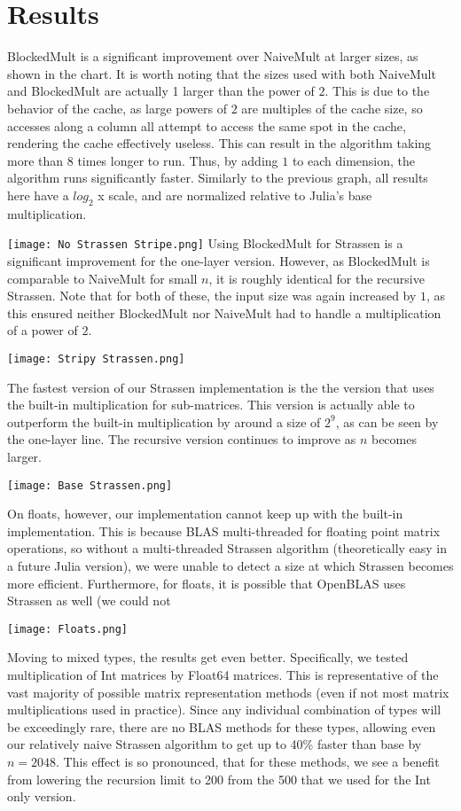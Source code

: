\documentclass{article}         %
\begin{document}
\section*{Results}
BlockedMult is a significant improvement over NaiveMult at larger sizes, as shown in the chart. It is worth noting that the sizes used with both NaiveMult and BlockedMult are actually 1 larger than the power of $2$. This is due to the behavior of the cache, as large powers of $2$ are multiples of the cache size, so accesses along a column all attempt to access the same spot in the cache, rendering the cache effectively useless. This can result in the algorithm taking more than $8$ times longer to run. Thus, by adding $1$ to each dimension, the algorithm runs significantly faster. Similarly to the previous graph, all results here have a $log_2$ x scale, and are normalized relative to Julia's base multiplication.

\texttt{[image: No Strassen Stripe.png]}
Using BlockedMult for Strassen is a significant improvement for the one-layer version. However, as BlockedMult is comparable to NaiveMult for small $n$, it is roughly identical for the recursive Strassen. Note that for both of these, the input size was again increased by $1$, as this ensured neither BlockedMult nor NaiveMult had to handle a multiplication of a power of $2$.

\texttt{[image: Stripy Strassen.png]}

The fastest version of our Strassen implementation is the the version that uses the built-in multiplication for sub-matrices. This version is actually able to outperform the built-in multiplication by around a size of $2^9$, as can be seen by the one-layer line. The recursive version continues to improve as $n$ becomes larger.

\texttt{[image: Base Strassen.png]}

On floats, however, our implementation cannot keep up with the built-in implementation. This is because BLAS multi-threaded for floating point matrix operations, so without a multi-threaded Strassen algorithm (theoretically easy in a future Julia version), we were unable to detect a size at which Strassen becomes more efficient. Furthermore, for floats, it is possible that OpenBLAS uses Strassen as well (we could not 

\texttt{[image: Floats.png]}

Moving to mixed types, the results get even better. Specifically, we tested multiplication of Int matrices by Float64 matrices. This is representative of the vast majority of possible matrix representation methods (even if not most matrix multiplications used in practice). Since
any individual combination of types will be exceedingly rare, there are no BLAS methods for these types, allowing even our relatively naive Strassen algorithm to get up to 40\% faster than base by $n=2048$. This effect is so pronounced, that for these methods, we see a benefit from lowering the recursion limit to 200 from the 500 that we used for the Int only version.
\end{document}

